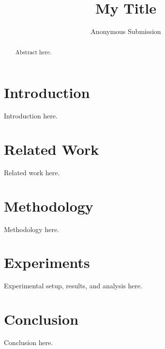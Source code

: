 \documentclass[letterpaper]{article}
\title{My Title}
\author{Anonymous Submission}
\begin{document}
\maketitle

\begin{abstract}
Abstract here.
\end{abstract}

\section{Introduction}
\label{sec:intro}
Introduction here.

\section{Related Work}
\label{sec:related_work}
Related work here.

\section{Methodology}
\label{sec:method}
Methodology here.

\section{Experiments}
\label{sec:experiments}
Experimental setup, results, and analysis here.

\section{Conclusion}
\label{sec:conclusion}
Conclusion here.



\end{document}
